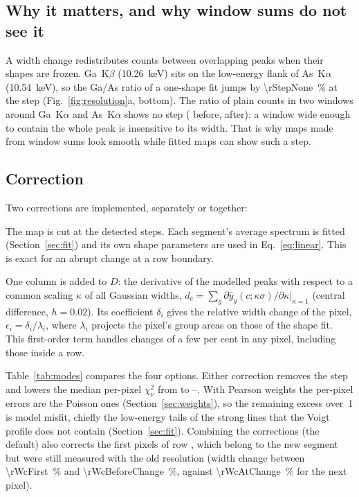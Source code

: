 \documentclass[11pt,a4paper]{article}
\begin{document}
\subsection{Why it matters, and why window sums do not see it}
A width change redistributes counts between overlapping peaks when their shapes are frozen. Ga~K$\beta$
(\qty{10.26}{keV}) sits on the low-energy flank of As~K$\alpha$ (\qty{10.54}{keV}), so the Ga/As ratio
of a one-shape fit jumps by \qty{\rStepNone}{\percent} at the step (Fig.~\ref{fig:resolution}a, bottom).
The ratio of plain counts in two windows around Ga~K$\alpha$ and As~K$\alpha$ shows no step
(\rRoiRatioBefore{} before, \rRoiRatioAfter{} after): a window wide enough to contain the whole peak is
insensitive to its width. That is why maps made from window sums look smooth while fitted maps can show
such a step.

\subsection{Correction}
Two corrections are implemented, separately or together:
\begin{description}[nosep,style=nextline]
\item[Segments.] The map is cut at the detected steps. Each segment's average spectrum is fitted
(Section~\ref{sec:fit}) and its own shape parameters are used in Eq.~\eqref{eq:linear}. This is exact for
an abrupt change at a row boundary.
\item[Linear width term.] One column is added to $D$: the derivative of the modelled peaks with respect
to a common scaling $\kappa$ of all Gaussian widths,
$d_c = \sum_g \partial\hat y_g(c;\kappa\sigma)/\partial\kappa|_{\kappa=1}$ (central difference, $h=0.02$).
Its coefficient $\delta_i$ gives the relative width change of the pixel, $\epsilon_i=\delta_i/\lambda_i$,
where $\lambda_i$ projects the pixel's group areas on those of the shape fit. This first-order term
handles changes of a few per cent in any pixel, including those inside a row.
\end{description}
Table~\ref{tab:modes} compares the four options. Either correction removes the step and lowers the
median per-pixel $\chi^2_\nu$ from \rChiMapNone{} to \rChiMapBoth--\rChiMapLin. With Pearson weights the
per-pixel errors are the Poisson ones (Section~\ref{sec:weights}), so the remaining excess over~1 is
model misfit, chiefly the low-energy tails of the strong lines that the Voigt profile does not contain
(Section~\ref{sec:fit}). Combining the corrections (the default) also corrects
the first \rChangePix{} pixels of row \rStepRow, which belong to the new segment but were still measured
with the old resolution (width change between \qty{\rWcFirst}{\percent} and \qty{\rWcBeforeChange}{\percent}, against
\qty{\rWcAtChange}{\percent} for the next pixel).
\end{document}
